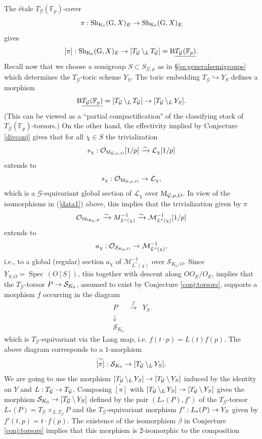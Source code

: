 \documentclass[reqno, 10pt]{amsart}
\makeatletter
\newcommand{\BF}{\ensuremath{\mathbb {F}}\xspace}
\newcommand{\CG}{\ensuremath{\mathcal {G}}\xspace}
\newcommand{\CL}{\ensuremath{\mathcal {L}}\xspace}
\newcommand{\CM}{\ensuremath{\mathcal {M}}\xspace}
\newcommand{\CO}{\ensuremath{\mathcal {O}}\xspace}
\newcommand{\CS}{\ensuremath{\mathcal {S}}\xspace}
\newcommand{\RB}{\ensuremath{\mathrm {B}}\xspace}
\newcommand{\RG}{\ensuremath{\mathrm {G}}\xspace}
\newcommand{\RK}{\ensuremath{\mathrm {K}}\xspace}
\DeclareMathOperator{\Spec}{Spec\,}
\newcommand{\wt}{\widetilde}
\newcommand{\bs}{\backslash}
\theoremstyle{definition}
\numberwithin{equation}{subsection}
\numberwithin{subsubsection}{subsection}
\renewcommand{\to}{%
   \ifbool{@display}{\longrightarrow}{\rightarrow}%
   }
\newcommand{\und}{\underline}
\newcommand{\Mloc}{{\rm M}}
\newcommand{\LBS}{\, {\bs}_{\vphantom{A}{L}}\, }
\makeatother
\begin{document}
The \'etale $T_\CG(\BF_p)$-cover 
\[
\pi: {\rm Sh}_{\RK_1}(\RG, X)_E\to {\rm Sh}_{\RK_0}(\RG, X)_E
\]
gives
\begin{equation}\label{gfiber1}
[\pi]: {\rm Sh}_{\RK_0}(\RG, X)_E\to  [T_\CG  \LBS T_\CG ]=\RB  \und{T_\CG(\BF_p)}.
\end{equation}
Recall now that we choose a semigroup $S\subset S_{\CG,\mu}$ as in \S \ref{ss:generalsemigroups} which determines the $T_\CG$-toric scheme $Y_S$. 
 The toric embedding $T_\CG\hookrightarrow Y_S$ defines a morphism
\[
\RB  \und{T_\CG (\BF_p)}= [T_\CG \LBS T_\CG ]\to  [T_\CG  \LBS Y_S ].
\]
(This can be viewed as a ``partial compactification" of the classifying stack of $T_\CG(\BF_p)$-torsors.)
On the other hand, the effectivity  implied by Conjecture \ref{divconj} gives that for all   $\chi \in S $ the trivialization
  \[
s_\chi: \CO_{\Mloc_{\CG,\mu, O}}[1/p]\xrightarrow{\sim} \CL_{\chi}[1/p]
\]
 extends to  
 \[
 s_\chi: \CO_{\Mloc_{\CG,\mu, O}}\to \CL_{\chi},
 \]
which is a $\CG$-equivariant global section of $\CL_\chi$ over $\Mloc_{\CG,\mu, O}$. In view 
of the isomorphisms in (\ref{data1}) above,  this implies that the trivialization given by $\pi$
\[
\CO_{{\rm Sh}_{K_0, F}}\xrightarrow{\sim} M^{-1}_{L^*(\chi)}\xrightarrow{\sim} \CM^{-1}_{L^*(\chi)}[1/p]
\]
 extends to 
\[
a_\chi: \CO_{\CS_{K_0,O}}\to \CM^{-1}_{L^*(\chi)} ,
\]
i.e., to a global (regular) section $a_\chi$ of $\CM^{-1}_{L^*(\chi)}$ over $\CS_{K_0,O}$.  Since $Y_{S,O}=\Spec(O[S])$, this together with descent along $OO_E/O_E$, implies that the $T_\CG$-torsor $P\to \CS_{K_0}$,
assumed to exist by Conjecture  \ref{conj:torsors}, supports a morphism $f$ occurring in the diagram 
\[
\begin{matrix}
P& \xrightarrow{\ f\ } & Y_S\\
\downarrow &&\\
\CS_{K_0}&&
\end{matrix}
\] 
which is $T_\CG$-equivariant via the Lang map, i.e. $f(t\cdot p)=L(t)f(p)$. The above diagram corresponds to a $1$-morphism
\begin{equation}\label{extend1}
\wt {[\pi]}: \CS_{K_0}\to  [T_\CG  \LBS Y_S ].
\end{equation}
We are going to use  the morphism $[T_\CG  \LBS Y_S ]\to [T_\CG\, \bs\, Y_S]$ induced by the identity on $Y$ and $L: T_\CG\to T_\CG$. Composing   $\wt{[\pi]}$ with $[T_\CG  \LBS Y_S ]\to [T_\CG\, \bs\, Y_S]$ gives the morphism $\CS_{K_0}\to  [T_\CG\,  \bs\, Y_S ]$ defined by the pair $(L_*(P), f')$ of the $T_\CG$-torsor $L_*(P)=T_\CG\times_{L, T_\CG} P$  and the $T_\CG$-equivariant morphism $f': L_*(P)\to Y_S$ given by $f'(t, p)=t\cdot f(p)$. The existence of the isomorphism $\beta$ in Conjecture \ref{conj:torsors} implies that this morphism is $2$-isomorphic to   the composition
\end{document}
